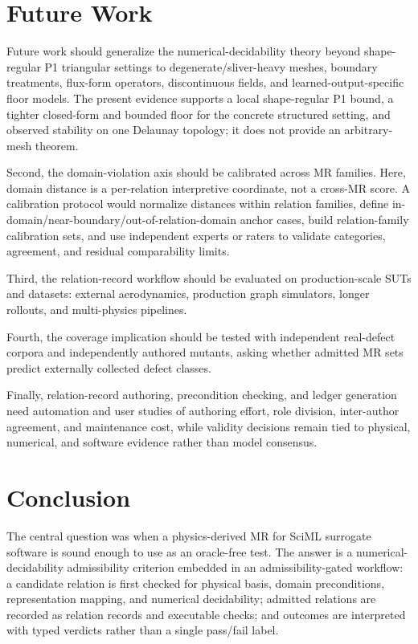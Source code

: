 \documentclass[preprint,12pt]{elsarticle}
\begin{document}
\section{Future Work}
\label{sec:future-work}

Future work should generalize the numerical-decidability theory beyond shape-regular P1 triangular settings to degenerate/sliver-heavy meshes, boundary treatments, flux-form operators, discontinuous fields, and learned-output-specific floor models. The present evidence supports a local shape-regular P1 bound, a tighter closed-form and bounded floor for the concrete structured setting, and observed stability on one Delaunay topology; it does not provide an arbitrary-mesh theorem.

Second, the domain-violation axis should be calibrated across MR families. Here, domain distance is a per-relation interpretive coordinate, not a cross-MR score. A calibration protocol would normalize distances within relation families, define in-domain/near-boundary/out-of-relation-domain anchor cases, build relation-family calibration sets, and use independent experts or raters to validate categories, agreement, and residual comparability limits.

Third, the relation-record workflow should be evaluated on production-scale SUTs and datasets: external aerodynamics, production graph simulators, longer rollouts, and multi-physics pipelines.

Fourth, the coverage implication should be tested with independent real-defect corpora and independently authored mutants, asking whether admitted MR sets predict externally collected defect classes.

Finally, relation-record authoring, precondition checking, and ledger generation need automation and user studies of authoring effort, role division, inter-author agreement, and maintenance cost, while validity decisions remain tied to physical, numerical, and software evidence rather than model consensus.

\section{Conclusion}
\label{sec:conclusion}

The central question was when a physics-derived MR for SciML surrogate software is sound enough to use as an oracle-free test. The answer is a numerical-decidability admissibility criterion embedded in an admissibility-gated workflow: a candidate relation is first checked for physical basis, domain preconditions, representation mapping, and numerical decidability; admitted relations are recorded as relation records and executable checks; and outcomes are interpreted with typed verdicts rather than a single pass/fail label.
\end{document}
